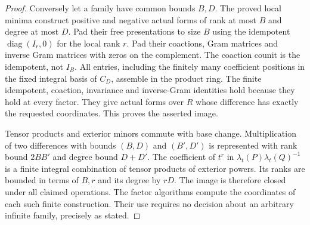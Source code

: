 \begin{proof}
Conversely let a family have common bounds $B,D$.
The proved local minima construct positive and
negative actual forms of rank at most $B$ and
degree at most $D$.  Pad their free presentations
to size $B$ using the idempotent
$\operatorname{diag}(I_r,0)$ for the local rank $r$.
Pad their coactions, Gram matrices and inverse
Gram matrices with zeros on the complement.
The coaction counit is the idempotent, not $I_B$.
All entries, including the finitely many coefficient
positions in the fixed integral basis of $C_D$,
assemble in the product ring.  The finite
idempotent, coaction, invariance and inverse-Gram
identities hold because they hold at every factor.
They give actual forms over $R$ whose difference
has exactly the requested coordinates.  This
proves the asserted image.

Tensor products and exterior minors commute with
base change.  Multiplication of two differences
with bounds $(B,D)$ and $(B',D')$ is represented
with rank bound $2BB'$ and degree bound $D+D'$.
The coefficient of $t^r$ in
$\lambda_t(P)\lambda_t(Q)^{-1}$ is a finite
integral combination of tensor products of
exterior powers.  Its ranks are bounded in
terms of $B,r$ and its degree by $rD$.
The image is therefore closed under all claimed
operations.  The factor algorithms compute the
coordinates of each such finite construction.
Their use requires no decision about an
arbitrary infinite family, precisely as stated.
\end{proof}
